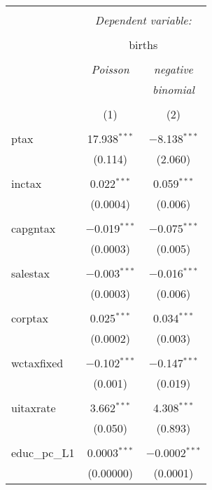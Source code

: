 
\begin{table}[!htbp] \centering 
  \caption{} 
  \label{} 
\begin{tabular}{@{\extracolsep{5pt}}lcc} 
\\[-1.8ex]\hline 
\hline \\[-1.8ex] 
 & \multicolumn{2}{c}{\textit{Dependent variable:}} \\ 
\cline{2-3} 
\\[-1.8ex] & \multicolumn{2}{c}{births} \\ 
\\[-1.8ex] & \textit{Poisson} & \textit{negative} \\ 
 & \textit{} & \textit{binomial} \\ 
\\[-1.8ex] & (1) & (2)\\ 
\hline \\[-1.8ex] 
 ptax & 17.938$^{***}$ & $-$8.138$^{***}$ \\ 
  & (0.114) & (2.060) \\ 
  & & \\ 
 inctax & 0.022$^{***}$ & 0.059$^{***}$ \\ 
  & (0.0004) & (0.006) \\ 
  & & \\ 
 capgntax & $-$0.019$^{***}$ & $-$0.075$^{***}$ \\ 
  & (0.0003) & (0.005) \\ 
  & & \\ 
 salestax & $-$0.003$^{***}$ & $-$0.016$^{***}$ \\ 
  & (0.0003) & (0.006) \\ 
  & & \\ 
 corptax & 0.025$^{***}$ & 0.034$^{***}$ \\ 
  & (0.0002) & (0.003) \\ 
  & & \\ 
 wctaxfixed & $-$0.102$^{***}$ & $-$0.147$^{***}$ \\ 
  & (0.001) & (0.019) \\ 
  & & \\ 
 uitaxrate & 3.662$^{***}$ & 4.308$^{***}$ \\ 
  & (0.050) & (0.893) \\ 
  & & \\ 
 educ\_pc\_L1 & 0.0003$^{***}$ & $-$0.0002$^{***}$ \\ 
  & (0.00000) & (0.0001) \\ 

\end{tabular}
\end{table}
